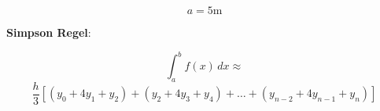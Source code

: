 \documentclass{article}
\begin{document}
   \thispagestyle{empty}
   \[ a = 5\text{m}\]

   \bigskip
   \textbf{Simpson Regel}:

   \[\int_{a}^{b}f(x)\,dx \approx \]\[\frac{h}{3}[(y_0+4y_1+y_2)+(y_2+4y_3+y_4)+\dots
   +(y_{n-2}+4y_{n-1}+y_n)]\]
\end{document}
